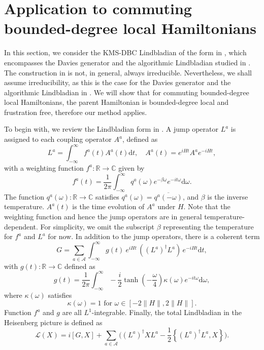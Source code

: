 \documentclass{article}
\theoremstyle{plain}
\theoremstyle{plain}
\theoremstyle{plain}
\theoremstyle{plain}
\theoremstyle{plain}
\theoremstyle{plain}
\theoremstyle{plain}
\newcommand{\dd}{\mathrm{d}}
\newcommand{\norm}[1]{\lVert #1 \rVert}
\newcommand{\intinf}{\int_{-\infty}^\infty}
\newcommand{\calA}{\ensuremath{\mathcal{A}}}
\newcommand{\calL}{\ensuremath{\mathcal{L}}}
\newcommand{\bbR}{\ensuremath{\mathbb{R}}}
\newcommand{\bbC}{\ensuremath{\mathbb{C}}}
\begin{document}
\section{Application to commuting bounded-degree local Hamiltonians}
\label{sec:commuting_ham}


In this section,
we consider the KMS-DBC Lindbladian of the form in \cite{Ding2025EfficientQuantumGibbs}, which encompasses the Davies generator \cite{Davies74,Davies76} and the algorithmic Lindbladian studied in \cite{ChenKastoryanoGilyen2023efficient}. The construction in \cite{Ding2025EfficientQuantumGibbs} is not, in general, always irreducible. Nevertheless, we shall assume irreducibility, as this is the case for the Davies generator and the algorithmic Lindbladian in \cite{ChenKastoryanoGilyen2023efficient}.  We will show that for commuting bounded-degree local Hamiltonians, the parent Hamiltonian is bounded-degree local and frustration free, therefore our method applies. 

To begin with, we review the Lindbladian form in \cite{Ding2025EfficientQuantumGibbs}.
A jump operator $L^a$ is assigned to each coupling operator $A^a$, defined as 
\begin{equation}
    L^a = \intinf f^a(t) A^a(t) \dd t , \quad A^a(t) = e^{iHt} A^a e^{-iHt},
\end{equation} with a weighting function $f^a: \bbR \to \bbC$ given by 
\begin{equation}
    f^a(t) = \frac{1}{2\pi } \intinf q^a(\omega) e^{-\beta \omega} e^{-it\omega} \dd \omega.
\end{equation} 
The function $q^a(\omega): \bbR \to \bbC$ satisfies $q^a(\omega) = \overline{q^a(-\omega)}$, and $\beta$ is the inverse temperature. 
$A^a(t)$ is the time evolution of $A^a$ under $H$. Note that the weighting function and hence the jump operators are in general temperature-dependent. For simplicity, we omit the subscript $\beta$ representing the temperature for $f^a$ and $L^a$ for now. 
In addition to the jump operators, there is a coherent term
\begin{equation}
    \label{eq:coherent_term_expression}
    G = \sum_{a\in \calA } \intinf g(t) \: e^{iHt} \, ((L^a)^\dag L^a) \, e^{-iHt} \dd t,
\end{equation} with $g(t):\bbR\to \bbC$ defined as
\begin{equation}
    g(t) = \frac{1}{2\pi } \intinf -\frac{i}{2} \tanh \left(-\frac{ \omega}{4} \right) \kappa(\omega) e^{-it\omega} \dd \omega,
\end{equation}  
where $\kappa(\omega)$ satisfies
\begin{equation}
    \kappa(\omega) = 1 \text{  for  } \omega \in [-2\norm{H}, 2 \norm{H}].
\end{equation}
Function $f^a$ and $g$ are all $L^1$-integrable. Finally, the total Lindbladian in the Heisenberg picture is defined as 
\begin{equation}
    \calL(X) = i[G,X] + \sum_{a\in\calA} \Big ( (L^a)^\dag X L^a - \frac{1}{2} \left\{ (L^a)^\dag L^a, X \right\} \Big).
\end{equation}
\end{document}
